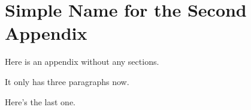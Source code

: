%
%
%
% 
%

\chapter{Simple Name for the Second Appendix}
\label{AppendixB}

Here is an appendix without any sections.

It only has three paragraphs now.

Here's the last one.
